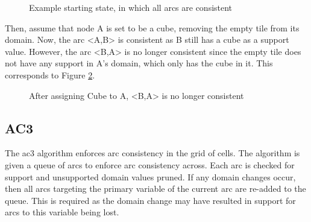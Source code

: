 \begin{figure}[H]
    \centering
    \caption{Example starting state, in which all arcs are consistent}
    \label{fig:arcsStart}
\end{figure}

Then, assume that node A is set to be a cube, removing the empty tile from its domain. Now, the arc <A,B> is consistent as B still has a cube as a support value. However, the arc <B,A> is no longer consistent since the empty tile does not have any support in A's domain, which only has the cube in it. This corresponds to Figure \ref{fig:arcsAssigned}.

\begin{figure}[H]
    \centering
    \caption{After assigning Cube to A, <B,A> is no longer consistent}
    \label{fig:arcsAssigned}
\end{figure}

\subsection{AC3}
The \acrfull{ac3} algorithm enforces arc consistency in the grid of cells. The algorithm is given a queue of arcs to enforce arc consistency across. Each arc is checked for support and unsupported domain values pruned. If any domain changes occur, then all arcs targeting the primary variable of the current arc are re-added to the queue. This is required as the domain change may have resulted in support for arcs to this variable being lost.

